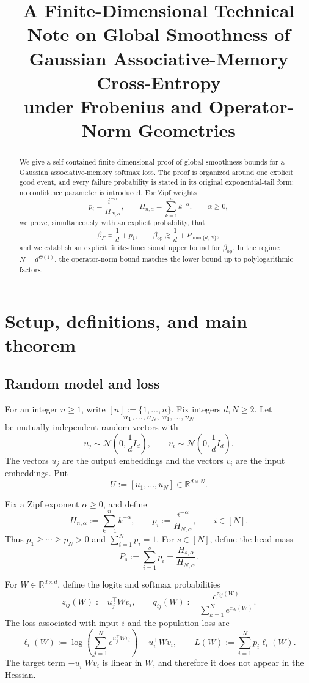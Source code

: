 \documentclass[11pt]{article}
\title{A Finite-Dimensional Technical Note on Global Smoothness of\\
Gaussian Associative-Memory Cross-Entropy\\
under Frobenius and Operator-Norm Geometries}
\author{}
\date{}
\newcommand{\R}{\mathbb{R}}
\newcommand{\1}{\mathbf{1}}
\newcommand{\op}{\mathrm{op}}
\begin{document}
\maketitle

\begin{abstract}
We give a self-contained finite-dimensional proof of global smoothness bounds for a
Gaussian associative-memory softmax loss.  The proof is organized around one explicit
good event, and every failure probability is stated in its original exponential-tail
form; no confidence parameter is introduced.  For Zipf weights
\[
 p_i=\frac{i^{-\alpha}}{H_{N,\alpha}},
 \qquad
 H_{n,\alpha}=\sum_{k=1}^n k^{-\alpha},
 \qquad \alpha\ge 0,
\]
we prove, simultaneously with an explicit probability, that
\[
 \beta_F\asymp \frac1d+p_1,
 \qquad
 \beta_{\op}\gtrsim \frac1d+P_{\min\{d,N\}},
\]
and we establish an explicit finite-dimensional upper bound for
\(\beta_{\op}\).  In the regime \(N=d^{\Theta(1)}\), the operator-norm
bound matches the lower bound up to polylogarithmic factors.
\end{abstract}

\tableofcontents

\section{Setup, definitions, and main theorem}
\label{sec:setup}

\subsection{Random model and loss}

For an integer \(n\ge 1\), write \([n]:=\{1,\ldots,n\}\).  Fix integers
\(d,N\ge 2\).  Let
\[
 u_1,\ldots,u_N,\ v_1,\ldots,v_N
\]
be mutually independent random vectors with
\[
 u_j\sim \mathcal N\!\left(0,\frac1d I_d\right),
 \qquad
 v_i\sim \mathcal N\!\left(0,\frac1d I_d\right).
\]
The vectors \(u_j\) are the output embeddings and the vectors \(v_i\) are the
input embeddings.  Put
\[
 U:=[u_1,\ldots,u_N]\in\R^{d\times N}.
\]

Fix a Zipf exponent \(\alpha\ge 0\), and define
\[
 H_{n,\alpha}:=\sum_{k=1}^n k^{-\alpha},
 \qquad
 p_i:=\frac{i^{-\alpha}}{H_{N,\alpha}},
 \qquad i\in[N].
\]
Thus \(p_1\ge\cdots\ge p_N>0\) and \(\sum_{i=1}^N p_i=1\).  For
\(s\in[N]\), define the head mass
\[
 P_s:=\sum_{i=1}^s p_i=\frac{H_{s,\alpha}}{H_{N,\alpha}}.
\]

For \(W\in\R^{d\times d}\), define the logits and softmax probabilities
\[
 z_{ij}(W):=u_j^\top Wv_i,
 \qquad
 q_{ij}(W):=\frac{e^{z_{ij}(W)}}{\sum_{k=1}^N e^{z_{ik}(W)}}.
\]
The loss associated with input \(i\) and the population loss are
\[
 \ell_i(W)
 :=
 \log\!\left(\sum_{j=1}^N e^{u_j^\top Wv_i}\right)-u_i^\top Wv_i,
 \qquad
 L(W):=\sum_{i=1}^N p_i\ell_i(W).
\]
The target term \(-u_i^\top Wv_i\) is linear in \(W\), and therefore it does
not appear in the Hessian.
\end{document}
